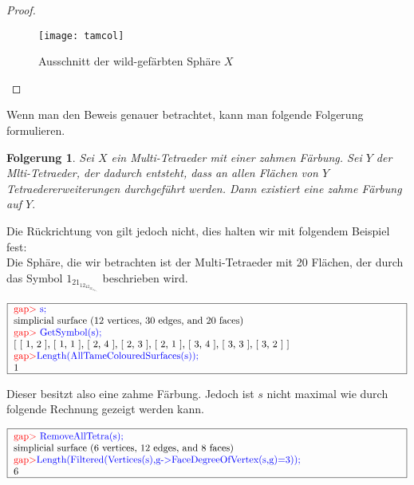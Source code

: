 \documentclass[12pt,titlepage,twoside,cleardoublepage]{article}
\newtheorem{folgerung}[zahl]{Folgerung}
\numberwithin{equation}{section}
\begin{document}
\begin{proof}
\begin{figure}[H]
\begin{center}
\texttt{[image: tamcol]}
\end{center}
\caption{Ausschnitt der wild-gefärbten Sphäre $X$}
\end{figure}
\end{proof}
Wenn man den Beweis genauer betrachtet, kann man folgende Folgerung formulieren.
\begin{folgerung}
Sei $X$ ein Multi-Tetraeder mit einer zahmen Färbung. Sei $Y$ der Mlti-Tetraeder, der dadurch entsteht, dass an allen Flächen von $Y$ Tetraedererweiterungen durchgeführt werden. Dann existiert eine zahme Färbung auf $Y.$
\end{folgerung}
Die Rückrichtung von  gilt jedoch nicht, dies halten wir mit folgendem Beispiel fest:\\
Die Sphäre, die wir betrachten ist der Multi-Tetraeder mit 20 Flächen, der durch das Symbol $1_21_12_42_32_13_43_33_2$ beschrieben wird.
\begin{center}
$\fbox{
\parbox{14cm}{
\textcolor{red}{gap$>$} \textcolor{blue}{s;}\newline
simplicial surface (12 vertices, 30 edges, and 20 faces)\newline
\textcolor{red}{gap$>$} \textcolor{blue}{GetSymbol(s);}\newline
[ [ 1, 2 ], [ 1, 1 ], [ 2, 4 ], [ 2, 3 ], [ 2, 1 ], [ 3, 4 ], [ 3, 3 ],
  [ 3, 2 ] ]\newline
\textcolor{red}{gap$>$}\textcolor{blue}{ Length(AllTameColouredSurfaces(s));}\newline
1
}}$
\end{center}
Dieser besitzt also eine zahme Färbung. Jedoch ist $s$ nicht maximal wie durch folgende Rechnung gezeigt werden kann.
\begin{center}
$\fbox{
\parbox{14cm}{
\textcolor{red}{gap$>$} \textcolor{blue}{RemoveAllTetra(s);}\newline
simplicial surface (6 vertices, 12 edges, and 8 faces)\newline
\textcolor{red}{gap$>$}\textcolor{blue}{ Length(Filtered(Vertices(s),g->FaceDegreeOfVertex(s,g)=3));}\newline
6
}}$
\end{center}
\end{document}
